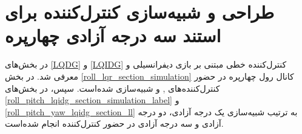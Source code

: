 \chapter{طراحی و شبیه‌سازی کنترل‌کننده برای استند سه درجه آزادی چهارپره}\label{MIL}
در بخش‌های
\ref{LQDG}
و
\ref{LQIDG}
کنترل‌کننده خطی مبتنی بر بازی دیفرانسیلی  و  معرفی شد.
در بخش
\ref{roll_lqr_section_simulation}
کانال 	رول چهارپره در حضور کنترل‌کننده‌های
,
و
شبیه‌سازی شده‌است. سپس، در بخش‌های
\ref{roll_pitch_lqidg_section_simulation_label}
و
\ref{roll_pitch_yaw_lqidg_section_ll}
به‌ ترتیب شبیه‌سازی یک درجه آزادی، دو درجه آزادی و سه درجه آزادی در حضور کنترل‌کننده‌  انجام شده‌است.
